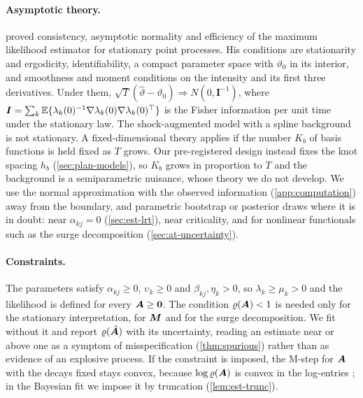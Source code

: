 \paragraph{Asymptotic theory.}  proved consistency, asymptotic normality
and efficiency of the maximum likelihood estimator for stationary point processes. His
conditions are stationarity and ergodicity, identifiability, a compact parameter space
with $\vartheta_0$ in its interior, and smoothness and moment conditions on the intensity
and its first three derivatives. Under them,
$\sqrt T(\hat\vartheta-\vartheta_0)\Rightarrow N(0,\bm I^{-1})$, where
$\bm I=\sum_k\mathbb{E}\{\lambda_k(0)^{-1}\nabla\lambda_k(0)\nabla\lambda_k(0)^{\top}\}$ is the Fisher
information per unit time under the stationary law. The shock-augmented model with a
spline background is not stationary. A fixed-dimensional theory applies if the number
$K_b$ of basis functions is held fixed as $T$ grows. Our pre-registered design instead
fixes the knot spacing $h_b$ (\cref{sec:plan-models}), so $K_b$ grows in proportion to $T$
and the background is a semiparametric nuisance, whose theory we do not develop. We use the
normal approximation with the observed information (\cref{app:computation}) away from the
boundary, and parametric bootstrap or posterior draws where it is in doubt: near
$\alpha_{kj}=0$ (\cref{sec:est-lrt}), near criticality, and for nonlinear functionals such
as the surge decomposition (\cref{sec:at-uncertainty}).

\paragraph{Constraints.} The parameters satisfy $\alpha_{kj}\ge0$, $\upsilon_k\ge0$ and
$\beta_{kj},\eta_k>0$, so $\lambda_k\ge\mu_k>0$ and the likelihood is defined for every
$\bm{A}\ge\mathbf{0}$. The condition $\varrho(\bm{A})<1$ is needed only for the stationary
interpretation, for $\bm{M}$ and for the surge decomposition. We fit without it and report
$\varrho(\hat{\bm{A}})$ with its uncertainty, reading an estimate near or above one as a symptom
of misspecification (\cref{thm:spurious}) rather than as evidence of an explosive process.
If the constraint is imposed, the M-step for $\bm{A}$ with the decays fixed stays convex,
because $\log\varrho(\bm{A})$ is convex in the log-entries \citep{kingman1961}; in the Bayesian
fit we impose it by truncation (\cref{lem:est-trunc}).

